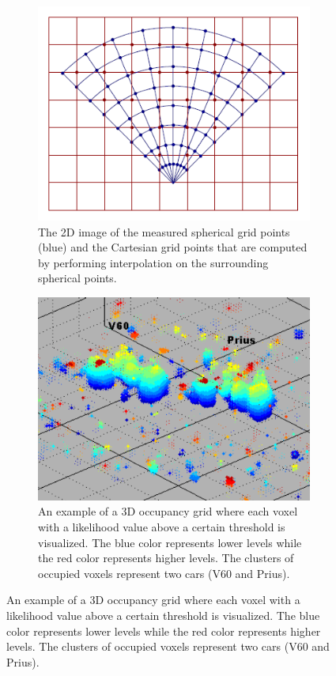 \begin{figure}[h]
	\centering
	\begin{subfigure}[t]{0.4\linewidth}
		\includegraphics[width=1\linewidth]{Figures/Occupancy_Grid_Map/3D_Occupancy_Grid_Spherical_Coord}
		\caption{The 2D image of the measured spherical grid points (blue) and the Cartesian grid points that are computed by performing interpolation on the surrounding spherical points. \cite{degerman20163d}}
		\label{fig:OGM3Dspherical}
	\end{subfigure} \hspace{0.1\textwidth}
	\begin{subfigure}[t]{0.4\linewidth}
		\includegraphics[width=1\linewidth]{Figures/Occupancy_Grid_Map/3D_Occupancy_Grid_example}
		\caption{An example of a 3D occupancy grid where each voxel with a likelihood value above a certain threshold is visualized. The blue color represents lower levels while the red color represents higher levels. The clusters of occupied voxels represent two cars (V60 and Prius). \cite{degerman20163d}}
		\label{fig:OGM3Dex}
	\end{subfigure}
	\label{fig:OGM3Dboth}
\end{figure}




